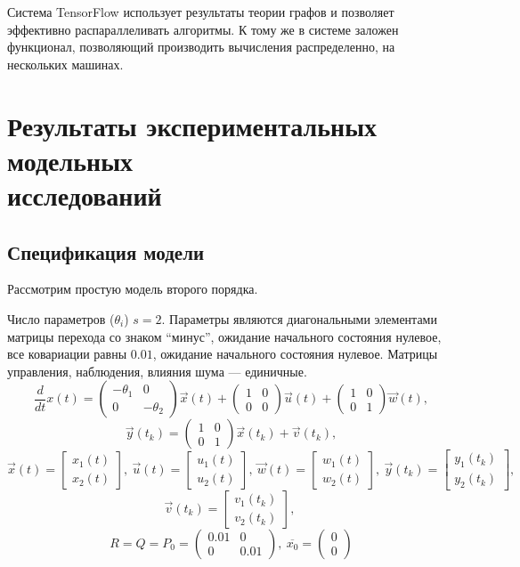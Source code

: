 \documentclass[a4paper,14pt]{extarticle}
\begin{document}
Система TensorFlow использует результаты теории графов и позволяет эффективно 
распараллеливать алгоритмы. К тому же в системе заложен функционал, позволяющий
производить вычисления распределенно, на нескольких машинах.

\section[Результаты экспериментальных модельных исследований]
{Результаты экспериментальных модельных \\исследований} 


\subsection{Спецификация модели}
Рассмотрим простую модель второго порядка. 

Число параметров ($\theta_i$) $s = 2$. Параметры являются диагональными
элементами матрицы перехода со знаком ``минус'', ожидание начального состояния
нулевое, все ковариации равны $0.01$, ожидание начального состояния нулевое.
Матрицы управления, наблюдения, влияния шума --- единичные.
\[
	\frac{d}{dt}x(t) =
		\begin{pmatrix}
			-\theta_1 & 0 \\
			0 & -\theta_2
		\end{pmatrix}
		\vec{x}(t) +
		\begin{pmatrix}
			1 & 0 \\
			0 & 0
		\end{pmatrix}
		\vec{u}(t) +
		\begin{pmatrix}
			1 & 0 \\
			0 & 1
		\end{pmatrix}
		\vec{w}(t),
\]
\[
	\vec{y}(t_k) =
	\begin{pmatrix}
		1 & 0 \\
		0 & 1
	\end{pmatrix}
	\vec{x}(t_k) + \vec{v}(t_k),
\]
\[
	\vec{x}(t) = \begin{bmatrix} x_1(t) \\ x_2(t) \end{bmatrix},\ 
	\vec{u}(t) = \begin{bmatrix} u_1(t) \\ u_2(t) \end{bmatrix},\
	\vec{w}(t) = \begin{bmatrix} w_1(t) \\ w_2(t) \end{bmatrix},\
	\vec{y}(t_k) = \begin{bmatrix} y_1(t_k) \\ y_2(t_k) \end{bmatrix},\
\]
\[
	\vec{v}(t_k) = \begin{bmatrix} v_1(t_k) \\ v_2(t_k) \end{bmatrix},\
\]
\[
	R = Q = P_0 = \begin{pmatrix} 0.01 & 0 \\ 0 & 0.01 \end{pmatrix},\
	\overline{x_0} = \begin{pmatrix} 0 \\ 0 \end{pmatrix}
\]
\end{document}
